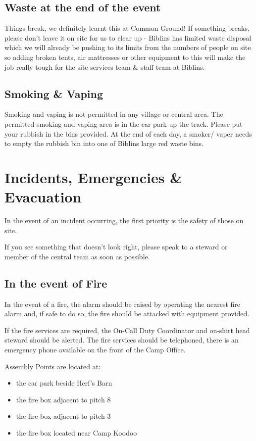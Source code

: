 \documentclass[a4paper, 11pt]{report}
\begin{document}
\section{Waste at the end of the event}
Things break, we definitely learnt this at Common Ground! If something breaks, please don't leave it on site for us to clear up - Biblins has limited waste disposal which we will already be pushing to its limits from the numbers of people on site so adding broken tents, air mattresses or other equipment to this will make the job really tough for the site services team \& staff team at Biblins. 

\section{Smoking \& Vaping}
Smoking and vaping is not permitted in any village or central area. The permitted smoking and vaping area is in the car park up the track. Please put your rubbish in the bins provided. At the end of each day, a smoker/ vaper needs to empty the rubbish bin into one of Biblins large red waste bins.

\chapter{Incidents, Emergencies \& Evacuation}
In the event of an incident occurring, the first priority is the safety of those on site.\nl

If you see something that doesn't look right, please speak to a steward or member of the central team as soon as possible.

\section{In the event of Fire}
In the event of a fire, the alarm should be raised by operating the nearest fire alarm and, if safe to do so, the fire should be attacked with equipment provided.\nl

If the fire services are required, the On-Call Duty Coordinator and on-shirt head steward should be alerted. The fire services should be telephoned, there is an emergency phone available on the front of the Camp Office.\nl

Assembly Points are located at:
\begin{itemize}
    \item the car park beside Herf's Barn
    \item the fire box adjacent to pitch 8
    \item the fire box adjacent to pitch 3
    \item the fire box located near Camp Koodoo
\end{itemize}
\end{document}
